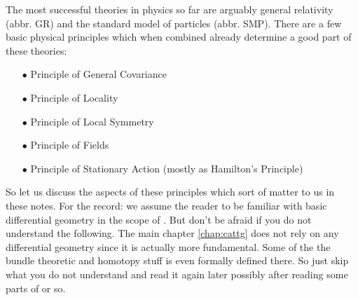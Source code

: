 The most successful theories in physics so far are arguably general relativity (abbr. GR) and the standard model of particles (abbr. SMP). There are a few basic physical principles which when combined already determine a good part of these theories:
\begin{enumerate}
\item[$\bullet$]
Principle of General Covariance
\item[$\bullet$]
Principle of Locality
\item[$\bullet$]
Principle of Local Symmetry
\item[$\bullet$]
Principle of Fields
\item[$\bullet$]
Principle of Stationary Action (mostly as Hamilton's Principle)
\end{enumerate}
So let us discuss the aspects of these principles which sort of matter to us in these notes. For the record: we assume the reader to be familiar with basic differential geometry in the scope of \cite{797789bc}. But don't be afraid if you do not understand the following. The main chapter \ref{chap:cattg} does not rely on any differential geometry since it is actually more fundamental. Some of the the bundle theoretic and homotopy stuff is even formally defined there. So just skip what you do not understand and read it again later possibly after reading some parts of \cite{797789bc} or so.
